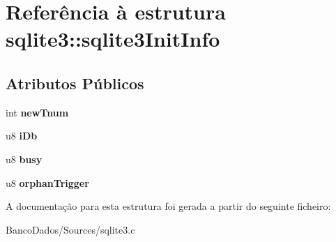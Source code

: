 \hypertarget{structsqlite3_1_1sqlite3_init_info}{\section{Referência à estrutura sqlite3\-:\-:sqlite3\-Init\-Info}
\label{structsqlite3_1_1sqlite3_init_info}
}
\subsection*{Atributos Públicos}
\begin{DoxyCompactItemize}
\item 
\hypertarget{structsqlite3_1_1sqlite3_init_info_a65250c8c5f215989e64294ede6c1c268}{int {\bfseries new\-Tnum}}\label{structsqlite3_1_1sqlite3_init_info_a65250c8c5f215989e64294ede6c1c268}

\item 
\hypertarget{structsqlite3_1_1sqlite3_init_info_af72389cb54753544c0f578605e6604bb}{u8 {\bfseries i\-Db}}\label{structsqlite3_1_1sqlite3_init_info_af72389cb54753544c0f578605e6604bb}

\item 
\hypertarget{structsqlite3_1_1sqlite3_init_info_a6ac01842e0ae68023cb60fea93bd8688}{u8 {\bfseries busy}}\label{structsqlite3_1_1sqlite3_init_info_a6ac01842e0ae68023cb60fea93bd8688}

\item 
\hypertarget{structsqlite3_1_1sqlite3_init_info_ac292839cc81d109206133a80949c45a6}{u8 {\bfseries orphan\-Trigger}}\label{structsqlite3_1_1sqlite3_init_info_ac292839cc81d109206133a80949c45a6}

\end{DoxyCompactItemize}


A documentação para esta estrutura foi gerada a partir do seguinte ficheiro\-:\begin{DoxyCompactItemize}
\item 
Banco\-Dados/\-Sources/sqlite3.\-c\end{DoxyCompactItemize}
